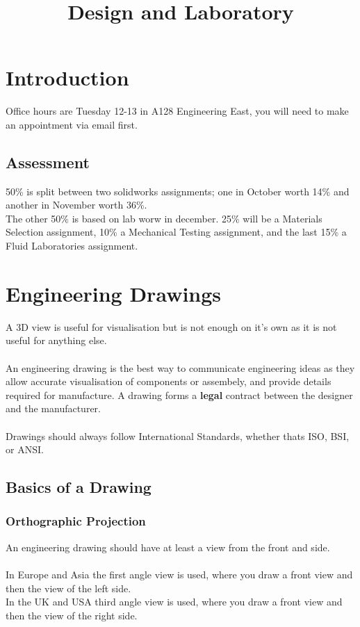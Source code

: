 \documentclass[12pt,a4paper]{article}
\begin{document}
\title{Design and Laboratory}
\date{}
\maketitle

\newpage

\tableofcontents

\newpage

\section{Introduction}
	Office hours are Tuesday 12-13 in A128 Engineering East, you will need to make an appointment via email first. 

	\subsection{Assessment}
		50\% is split between two solidworks assignments; one in October worth 14\% and another in November worth 36\%. \\
		The other 50\% is based on lab worw in december. 25\% will be a Materials Selection assignment, 10\% a Mechanical Testing assignment, and the last 15\% a Fluid Laboratories assignment. 
		
\newpage
		
\section{Engineering Drawings}
	A 3D view is useful for visualisation but is not enough on it's own as it is not useful for anything else. \\
	\\
	An engineering drawing is the best way to communicate engineering ideas as they allow accurate visualisation of components or assembely, and provide details required for manufacture. A drawing forms a \textbf{legal} contract between the designer and the manufacturer. \\
	\\
	Drawings should always follow International Standards, whether thats ISO, BSI, or ANSI. 
		
	\subsection{Basics of a Drawing}
		\subsubsection{Orthographic Projection}
			An engineering drawing should have at least a view from the front and side. \\
			\\
			In Europe and Asia the first angle view is used, where you draw a front view and then the view of the left side. \\
			In the UK and USA third angle view is used, where you draw a front view and then the view of the right side.
			
\end{document}
